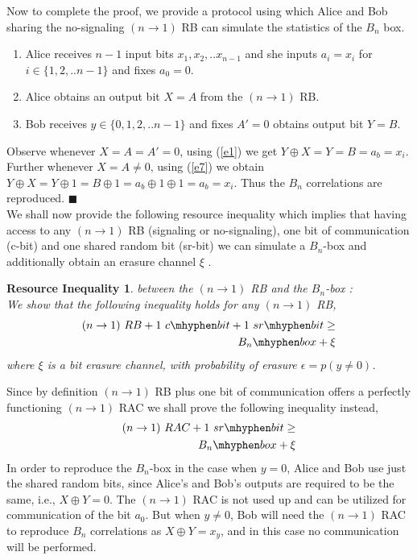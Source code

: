 \documentclass[%
 reprint,
 amsmath,amssymb,
 aps,
]{revtex4-1}
\newtheorem{mydef3}{Resource Inequality}
\begin{document}
\noindent Now to complete the proof, we provide a protocol using which Alice and Bob sharing the  no-signaling  $(n\rightarrow1)$ RB can simulate the statistics of the $B_n$ box.
\begin{enumerate}
\item Alice receives $n-1$ input bits $x_1,x_2,..x_{n-1}$ and she inputs $a_i=x_i$ for $i\in\{1,2,..n-1\}$ and fixes $a_0=0$.
\item Alice obtains an output bit $X=A$ from the $(n\rightarrow 1)$ RB.
\item Bob receives $y\in \{0,1,2,..n-1\}$ and fixes $A'=0$ obtains output bit  $Y=B$.
\end{enumerate}
\noindent Observe whenever $X=A=A'=0$, using (\ref{e1}) we get $Y\oplus X=Y=B=a_b=x_i$. Further whenever $X=A\neq 0$, using (\ref{e7}) we obtain $Y\oplus X=Y\oplus 1=B\oplus 1=a_b\oplus 1 \oplus 1=a_b=x_i$. Thus the $B_n$ correlations are reproduced. $\blacksquare$ \\ 
We shall now provide the following resource inequality which implies that having access to any $(n\rightarrow1)$ RB (signaling or no-signaling), one bit of communication (c-bit) and one shared random bit (sr-bit) we can simulate a $B_n$-box and additionally obtain an erasure channel $\xi$ .
\begin{mydef3}\label{re1}
between the $(n\rightarrow1)$ RB and the $B_n$-box : \\
We show that the following inequality holds for any $(n\rightarrow1)$ RB,
\begin{eqnarray} 
(n\rightarrow1)\ RB  +1\ c\mhyphen bit + 1\  sr\mhyphen bit \geq \nonumber \\ B_n\mhyphen box + \xi
\end{eqnarray}
where $\xi$ is a bit erasure channel, with probability of erasure $\epsilon=p(y\neq 0)$.
\end{mydef3}
 Since by definition $(n\rightarrow1)$ RB plus one bit of communication offers a perfectly functioning $(n\rightarrow1)$ RAC we shall prove the following inequality instead,
\begin{eqnarray}
(n\rightarrow1)\ RAC + 1\  sr\mhyphen bit \geq \nonumber \\ B_n\mhyphen box + \xi
\end{eqnarray}
In order to reproduce the $B_n$-box in the case when $y=0$, Alice and Bob use just the shared random bits, since Alice's and Bob's outputs are required to be the same, i.e., $X\oplus Y=0$. The $(n\rightarrow1)$ RAC is not used up and can be utilized for communication of the bit $a_0$. But when $y\neq 0$, Bob will need the $(n\rightarrow1)$ RAC to reproduce $B_n$ correlations as $X\oplus Y=x_y$, and in this case no communication will be performed. \\
\end{document}
